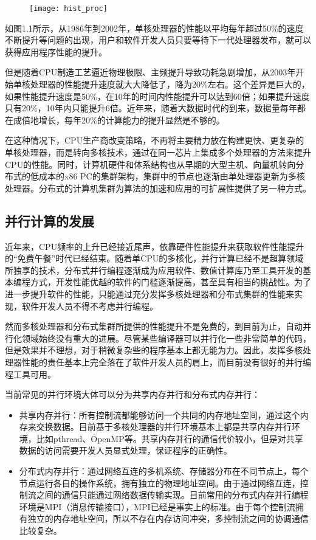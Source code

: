\begin{figure}[!htbp]
    \centering
    \texttt{[image: hist\_proc]}
    \label{fig:hist_proc}
\end{figure}

如图1.1\citep{edwards2011arch}所示，从1986年到2002年，单核处理器的性能以平均每年超过50\%的速度不断提升等问题的出现，用户和软件开发人员只要等待下一代处理器发布，就可以获得应用程序性能的提升。

但是随着CPU制造工艺逼近物理极限、主频提升导致功耗急剧增加，从2003年开始单核处理器的性能提升速度就大大降低了，降为20\%左右。这个差异是巨大的，如果性能提升速度是50\%，在10年的时间内性能提升可以达到60倍；如果提升速度只有20\%，10年内只能提升6倍\citep{pacheco2011introduction}。近年来，随着大数据时代的到来，数据量每年都在成倍地增长，每年20\%的计算能力的提升显然是不够的。

在这种情况下，CPU生产商改变策略，不再将主要精力放在构建更快、更复杂的单核处理器，而是转向多核技术，通过在同一芯片上集成多个处理器的方法来提升CPU的性能。同时，计算机硬件和体系结构也从早期的大型主机、向量机转向分布式的低成本的x86 PC的集群架构，集群中的节点也逐渐由单处理器更新为多核处理器。分布式的计算机集群为算法的加速和应用的可扩展性提供了另一种方式。

\subsection{并行计算的发展}

近年来，CPU频率的上升已经接近尾声，依靠硬件性能提升来获取软件性能提升的“免费午餐”时代已经结束。随着单CPU的多核化，并行计算已经不是超算领域所独享的技术，分布式并行编程逐渐成为应用软件、数值计算库乃至工具开发的基本编程方式，开发性能优越的软件的门槛逐渐提高，甚至具有相当的挑战性。为了进一步提升软件的性能，只能通过充分发挥多核处理器和分布式集群的性能来实现，软件开发人员不得不考虑并行编程。

然而多核处理器和分布式集群所提供的性能提升不是免费的，到目前为止，自动并行化领域始终没有重大的进展。尽管某些编译器可以并行化一些非常简单的代码，但是效果并不理想，对于稍微复杂些的程序基本上都无能为力。因此，发挥多核处理器性能的责任基本上完全落在了软件开发人员的肩上，而目前没有很好的并行编程工具可用\citep{liuwenzhi2015paraalgo}。

当前常见的并行环境大体可以分为共享内存并行和分布式内存并行：
\begin{itemize}
	\item 共享内存并行：所有控制流都能够访问一个共同的内存地址空间，通过这个内存来交换数据。目前基于多核处理器的并行环境基本上都是共享内存并行环境，比如pthread、OpenMP等。共享内存并行的通信代价较小，但是对共享数据的访问需要开发人员显式处理，保证程序的正确性。
	\item 分布式内存并行：通过网络互连的多机系统、存储器分布在不同节点上，每个节点运行各自的操作系统，拥有独立的物理地址空间。由于通过网络互连，控制流之间的通信只能通过网络数据传输实现。目前常用的分布式内存并行编程环境是MPI（消息传输接口），MPI已经是事实上的标准。由于每个控制流拥有独立的内存地址空间，所以不存在内存访问冲突，多控制流之间的协调通信比较复杂。
\end{itemize}

